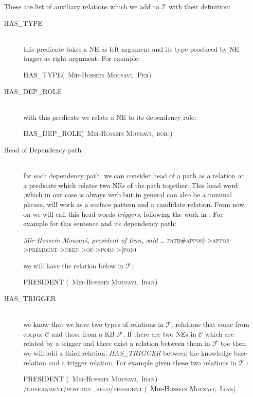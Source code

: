 These are list of auxiliary relations which we add to $\mathcal{T}$ with their
definition:
\begin {description}
\item[HAS\_TYPE] \hfil \\this predicate takes a NE as left argument and its type
produced by NE-tagger as right argument. For example:
\begin{center}
 \textsc{HAS\_TYPE(~Mir-Hossein Mousavi,~Per)}
 \end{center}

\item[HAS\_DEP\_ROLE]\hfil \\ with this predicate we relate a NE to its
dependency role:

\begin{center}
 \textsc{ HAS\_DEP\_ROLE(~Mir-Hossein Mousavi,~dobj)}
 \end{center}
 
 \item[Head of Dependency path]\hfil \\ for each dependency path, we can
 consider head of a path as a relation or a predicate which relates two NEs of the path
 together. This head word ,which in our case is always verb but in general can
 also be a nominal phrase, will work as a surface pattern and a candidate
 relation. From now on we will call this head words \textit{triggers},
 following the work in \cite{UniversalSchema}.
 For example for this sentence and its dependency path:
\begin{center}
 \textit{Mir-Hossein Mousavi, president of Iran, said \ldots}
 \textsc{path\#appos|->appos->president->prep->of->pobj->|pobj }
 \end{center}
 
 we will have the relation below in $\mathcal{T}$:
 \begin{center}
 \textsc{PRESIDENT (~Mir-Hossein Mousavi,~Iran)}
 \end{center}
 


\item[HAS\_TRIGGER]\hfil \\we know that we have two types of relations in
$\mathcal{T}$, relations that come from corpus $\mathcal{C}$ and those from a KB
$\mathcal{F}$. If there are two NEs in $\mathcal{C}$ which are related by a
trigger and there exist a relation between them in $\mathcal{F}$ too then we
will add a third relation, \textit{HAS\_TRIGGER} between the knowledge base
relation and a trigger relation. For example given these two relations in
$\mathcal{T}$ :
\begin{center}
 \textsc{PRESIDENT (~Mir-Hossein Mousavi,~Iran)}
 \textsc{ /government/position\_held/president (~Mir-Hossein Mousavi,~Iran)}
 \end{center}
 

\end{description}
